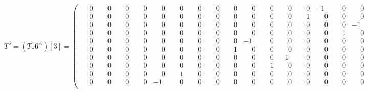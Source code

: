 \documentclass[10pt]{article}
\begin{document}
\[
T^{3} = (T16^A)[3] = \left(\begin{smallmatrix}
\phantom{-}0 & \phantom{-}0 & \phantom{-}0 & \phantom{-}0 & \phantom{-}0 & \phantom{-}0 & \phantom{-}0 & \phantom{-}0 & \phantom{-}0 & \phantom{-}0 & \phantom{-}0 & \phantom{-}0 & \phantom{-}0 & -1 & \phantom{-}0 & \phantom{-}0 \\
\phantom{-}0 & \phantom{-}0 & \phantom{-}0 & \phantom{-}0 & \phantom{-}0 & \phantom{-}0 & \phantom{-}0 & \phantom{-}0 & \phantom{-}0 & \phantom{-}0 & \phantom{-}0 & \phantom{-}0 & \phantom{-}1 & \phantom{-}0 & \phantom{-}0 & \phantom{-}0 \\
\phantom{-}0 & \phantom{-}0 & \phantom{-}0 & \phantom{-}0 & \phantom{-}0 & \phantom{-}0 & \phantom{-}0 & \phantom{-}0 & \phantom{-}0 & \phantom{-}0 & \phantom{-}0 & \phantom{-}0 & \phantom{-}0 & \phantom{-}0 & \phantom{-}0 & -1 \\
\phantom{-}0 & \phantom{-}0 & \phantom{-}0 & \phantom{-}0 & \phantom{-}0 & \phantom{-}0 & \phantom{-}0 & \phantom{-}0 & \phantom{-}0 & \phantom{-}0 & \phantom{-}0 & \phantom{-}0 & \phantom{-}0 & \phantom{-}0 & \phantom{-}1 & \phantom{-}0 \\
\phantom{-}0 & \phantom{-}0 & \phantom{-}0 & \phantom{-}0 & \phantom{-}0 & \phantom{-}0 & \phantom{-}0 & \phantom{-}0 & \phantom{-}0 & -1 & \phantom{-}0 & \phantom{-}0 & \phantom{-}0 & \phantom{-}0 & \phantom{-}0 & \phantom{-}0 \\
\phantom{-}0 & \phantom{-}0 & \phantom{-}0 & \phantom{-}0 & \phantom{-}0 & \phantom{-}0 & \phantom{-}0 & \phantom{-}0 & \phantom{-}1 & \phantom{-}0 & \phantom{-}0 & \phantom{-}0 & \phantom{-}0 & \phantom{-}0 & \phantom{-}0 & \phantom{-}0 \\
\phantom{-}0 & \phantom{-}0 & \phantom{-}0 & \phantom{-}0 & \phantom{-}0 & \phantom{-}0 & \phantom{-}0 & \phantom{-}0 & \phantom{-}0 & \phantom{-}0 & \phantom{-}0 & -1 & \phantom{-}0 & \phantom{-}0 & \phantom{-}0 & \phantom{-}0 \\
\phantom{-}0 & \phantom{-}0 & \phantom{-}0 & \phantom{-}0 & \phantom{-}0 & \phantom{-}0 & \phantom{-}0 & \phantom{-}0 & \phantom{-}0 & \phantom{-}0 & \phantom{-}1 & \phantom{-}0 & \phantom{-}0 & \phantom{-}0 & \phantom{-}0 & \phantom{-}0 \\
\phantom{-}0 & \phantom{-}0 & \phantom{-}0 & \phantom{-}0 & \phantom{-}0 & \phantom{-}1 & \phantom{-}0 & \phantom{-}0 & \phantom{-}0 & \phantom{-}0 & \phantom{-}0 & \phantom{-}0 & \phantom{-}0 & \phantom{-}0 & \phantom{-}0 & \phantom{-}0 \\
\phantom{-}0 & \phantom{-}0 & \phantom{-}0 & \phantom{-}0 & -1 & \phantom{-}0 & \phantom{-}0 & \phantom{-}0 & \phantom{-}0 & \phantom{-}0 & \phantom{-}0 & \phantom{-}0 & \phantom{-}0 & \phantom{-}0 & \phantom{-}0 & \phantom{-}0 \\

\end{smallmatrix}\]
\end{document}
